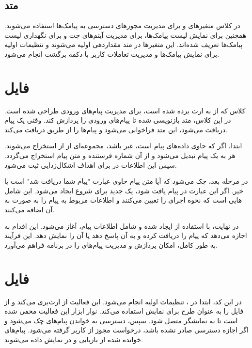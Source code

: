 \documentclass{report}
\begin{document}
\subsection{متد
}
در کلاس
 متغیرهای
  و 
  برای مدیریت مجوزهای دسترسی به پیامک‌ها استفاده می‌شوند. همچنین 
  برای نمایش لیست پیامک‌ها،
   برای مدیریت آیتم‌های چت و 
   برای نگهداری لیست پیامک‌ها تعریف شده‌اند. این متغیرها در متد
    مقداردهی اولیه می‌شوند و تنظیمات اولیه برای نمایش پیامک‌ها و مدیریت تعاملات کاربر با دکمه برگشت انجام می‌شود.
    
    
\section{فایل
}  
کلاس
 که از
  به ارث برده شده است، برای مدیریت پیام‌های ورودی
   طراحی شده است. در این کلاس، متد
    بازنویسی شده تا پیام‌های
     ورودی را پردازش کند. وقتی یک پیام 
     دریافت می‌شود، این متد فراخوانی می‌شود و پیام‌ها را از طریق
      دریافت می‌کند.

ابتدا، اگر
  که حاوی داده‌های پیام است، غیر 
   باشد، مجموعه‌ای از
     از
      استخراج می‌شوند. هر
       به یک پیام 
       تبدیل می‌شود و از آن شماره فرستنده و متن پیام استخراج می‌گردد. سپس این اطلاعات در
        برای اهداف اشکال‌زدایی ثبت می‌شود.

در مرحله بعد، چک می‌شود که آیا متن پیام حاوی عبارت "پیام شما دریافت شد" است یا خیر. اگر این عبارت در پیام یافت شود، یک
 جدید برای شروع
  ایجاد می‌شود. این
   شامل
    هایی است که نحوه اجرای
     را تعیین می‌کنند و اطلاعات مربوط به پیام را به صورت
      به آن اضافه می‌کنند.

در نهایت،
 با استفاده از 
 ایجاد شده و شامل اطلاعات پیام، آغاز می‌شود. این اقدام به 
 اجازه می‌دهد که پیام را دریافت کرده و به آن پاسخ دهد یا آن را نمایش دهد. این فرآیند به طور کامل، امکان پردازش و مدیریت پیام‌های 
 را در برنامه فراهم می‌آورد.
 
 
 
\section{فایل
}
در این کد، ابتدا در 
، تنظیمات اولیه انجام می‌شود. این فعالیت از
 ارث‌بری می‌کند و از
   فایل
     را به عنوان طرح برای نمایش استفاده می‌کند. نوار ابزار این فعالیت مخفی شده است تا به نمایشگر متصل شود. سپس، دسترسی به خواندن پیام‌های
       چک می‌شود و اگر اجازه دسترسی صادر نشده باشد، درخواست مجوز از کاربر گرفته می‌شود. پیام‌های
         خوانده شده از
          بازیابی و در
           نمایش داده می‌شوند.
\end{document}
